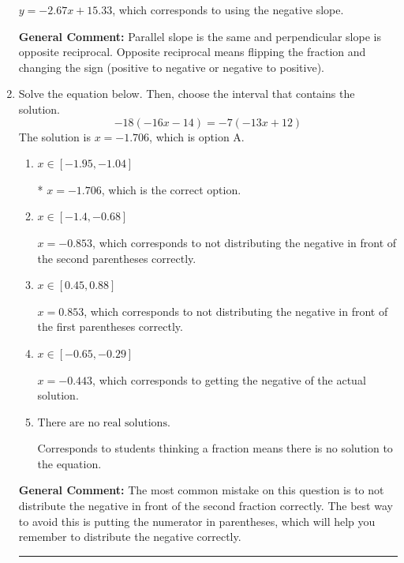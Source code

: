 \documentclass{extbook}[14pt]
\newcommand{\litem}[1]{\item #1

\rule{\textwidth}{0.4pt}}
\begin{document}
\begin{enumerate}
{\begin{enumerate}[label=\Alph*.]
 $y = -2.67x + 15.33$, which corresponds to using the negative slope.
\end{enumerate}

\textbf{General Comment:} Parallel slope is the same and perpendicular slope is opposite reciprocal. Opposite reciprocal means flipping the fraction and changing the sign (positive to negative or negative to positive).
}
\litem{
Solve the equation below. Then, choose the interval that contains the solution.
\[ -18(-16x -14) = -7(-13x + 12) \]The solution is \( x = -1.706 \), which is option A.\begin{enumerate}[label=\Alph*.]
\item \( x \in [-1.95, -1.04] \)

* $x = -1.706$, which is the correct option.
\item \( x \in [-1.4, -0.68] \)

$x = -0.853$, which corresponds to not distributing the negative in front of the second parentheses correctly.
\item \( x \in [0.45, 0.88] \)

$x = 0.853$, which corresponds to not distributing the negative in front of the first parentheses correctly.
\item \( x \in [-0.65, -0.29] \)

$x = -0.443$, which corresponds to getting the negative of the actual solution.
\item \( \text{There are no real solutions.} \)

Corresponds to students thinking a fraction means there is no solution to the equation.
\end{enumerate}

\textbf{General Comment:} The most common mistake on this question is to not distribute the negative in front of the second fraction correctly. The best way to avoid this is putting the numerator in parentheses, which will help you remember to distribute the negative correctly.
}
\end{enumerate}
\end{document}
